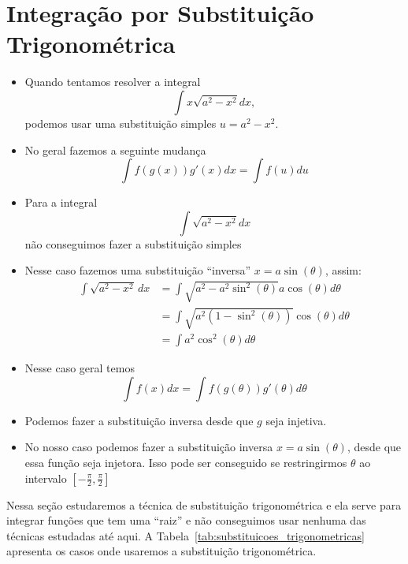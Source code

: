 \section{Integração por Substituição Trigonométrica}
\label{sec:Integracao_substituicao_Trigonometrica}


\begin{itemize}
  \item Quando tentamos resolver a integral
        \[
          \int x \sqrt{a^2-x^2}dx,
        \]
        podemos usar uma substituição simples $u=a^2-x^2$.

  \item No geral fazemos a seguinte mudança
        \[
          \int f(g(x))g'(x) dx= \int f(u)du
        \]

  \item Para a integral
        \[
          \int \sqrt{a^2-x^2}dx
        \]
        não conseguimos fazer a
        substituição simples

  \item Nesse caso fazemos uma substituição ``inversa''
  $x=a\sin( \theta )$, assim:
  \begin{align*}
    \int \sqrt{a^2-x^2}\,dx
    & = \int \sqrt{a^2-a^2 \sin^2(\theta)} a\cos(\theta) d \theta \\
    & = \int \sqrt{a^2(1-\sin^2(\theta))} \cos(\theta) d\theta \\
    & = \int a^2 \cos^2 (\theta) d\theta
  \end{align*}

  \item Nesse caso geral temos
        \[
          \int f(x)dx= \int f(g(\theta)) g'(\theta) d \theta
        \]

  \item Podemos fazer a substituição inversa desde que $g$ seja injetiva.

  \item No nosso caso  podemos fazer a substituição inversa $x=a\sin(\theta)$,
        desde que essa função seja injetora. Isso pode ser conseguido se
        restringirmos $\theta$ ao intervalo
        \(\left[-\frac{\pi}{2}, \frac{\pi}{2}\right]\)

\end{itemize}
Nessa seção estudaremos a técnica de substituição trigonométrica e ela serve
para integrar funções que tem uma ``raiz'' e não conseguimos usar nenhuma das
técnicas estudadas até aqui. A Tabela~\ref{tab:substituicoes_trigonometricas}
apresenta os casos onde usaremos a substituição trigonométrica.

